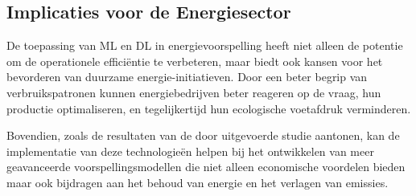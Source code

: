 \subsection{Implicaties voor de Energiesector}
De toepassing van ML en DL in energievoorspelling heeft niet alleen de potentie om de operationele efficiëntie te verbeteren, maar biedt ook kansen voor het bevorderen van duurzame energie-initiatieven. Door een beter begrip van verbruikspatronen kunnen energiebedrijven beter reageren op de vraag, hun productie optimaliseren, en tegelijkertijd hun ecologische voetafdruk verminderen.

Bovendien, zoals de resultaten van de door \textcite{Alanbar_2020} uitgevoerde studie aantonen, kan de implementatie van deze technologieën helpen bij het ontwikkelen van meer geavanceerde voorspellingsmodellen die niet alleen economische voordelen bieden maar ook bijdragen aan het behoud van energie en het verlagen van emissies.

